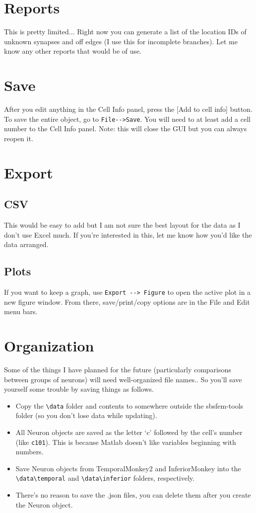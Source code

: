 \documentclass[]{exam}
\begin{document}
	\section{Reports}
		This is pretty limited... Right now you can generate a list of the location IDs of unknown synapses and off edges (I use this for incomplete branches). Let me know any other reports that would be of use.
	\section{Save}
	After you edit anything in the Cell Info panel, press the [Add to cell info] button.\\
	To save the entire object, go to \verb|File-->Save|. You will need to at least add a cell number to the Cell Info panel. Note: this will close the GUI but you can always reopen it.
	\section{Export}
		\subsection{CSV}
			This would be easy to add but I am not sure the best layout for the data as I don't use Excel much. If you're interested in this, let me know how you'd like the data arranged.
		\subsection{Plots}
			If you want to keep a graph, use \verb|Export --> Figure| to open the active plot in a new figure window. From there, save/print/copy options are in the File and Edit menu bars.
	
	\section{Organization}
	Some of the things I have planned for the future (particularly comparisons between groups of neurons) will need well-organized file names.. So you'll save yourself some trouble by saving things as follows.
	\begin{itemize}
		\item Copy the \verb|\data| folder and contents to somewhere outside the sbsfem-tools folder (so you don't lose data while updating).
		\item All Neuron objects are saved as the letter `c' followed by the cell's number (like  \verb|c101|). This is because Matlab doesn't like variables beginning with numbers.
		\item Save Neuron objects from TemporalMonkey2 and InferiorMonkey into the \verb|\data\temporal| and \verb|\data\inferior| folders, respectively.
		\item There's no reason to save the .json files, you can delete them after you create the Neuron object.
	\end{itemize}
	
\end{document}
